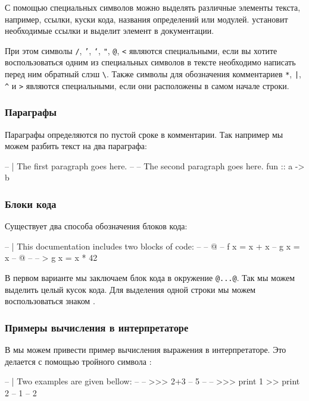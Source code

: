 С помощью специальных символов можно выделять различные 
элементы текста, например, ссылки, куски кода, названия
определений или модулей.  установит 
необходимые ссылки и выделит элемент в документации.

При этом символы \texttt{/}, \texttt{'}, \texttt{`}, \texttt{"},
\texttt{@}, \texttt{<} являются специальными, если вы хотите воспользоваться
одним из специальных символов в тексте необходимо написать перед ним
обратный слэш \verb!\!. Также символы для обозначения
комментариев \texttt{*}, \texttt{|}, \texttt{\^} и \texttt{>}  являются специальными,
если они расположены в самом начале строки.


\subsubsection{Параграфы}

Параграфы определяются по пустой сроке в комментарии.
Так например мы можем разбить текст на два параграфа:

\begin{code}
-- | The first paragraph goes here.
--
-- The second paragraph goes here.
fun :: a -> b
\end{code}

\subsubsection{Блоки кода}

Существует два способа обозначения блоков кода:

\begin{code}
-- | This documentation includes two blocks of code:
--
-- @
--     f x = x + x
--     g x = x
-- @
--
-- >  g x = x * 42
\end{code}

В первом варианте мы заключаем блок кода в окружение \verb!@...@!.
Так мы можем выделить целый кусок кода. Для выделения одной строки
мы можем воспользоваться знаком \In{>}.

\subsubsection{Примеры вычисления в интерпретаторе}

В  мы можем привести пример вычисления 
выражения в интерпретаторе. Это делается с помощью 
тройного символа \In{>}:

\begin{code}
-- | Two examples are given bellow:
--
-- >>> 2+3
-- 5
--
-- >>> print 1 >> print 2
-- 1
-- 2
\end{code}

